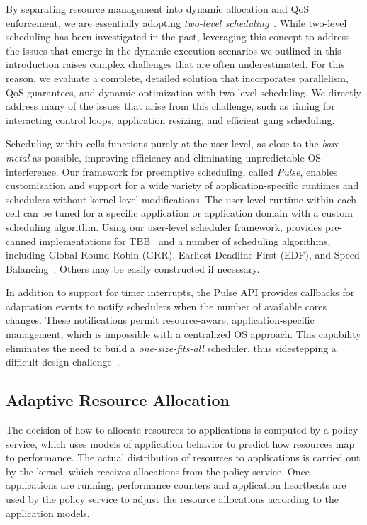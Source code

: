 By separating resource management into dynamic allocation and QoS
enforcement, we are essentially adopting \emph{two-level
scheduling}~\cite{leiner07,ober08,tess_resource}.
While two-level scheduling has been investigated in the past,
leveraging this concept to address the issues that emerge in the dynamic
execution scenarios we outlined in this introduction raises complex challenges
that are often underestimated.  For this
reason, we evaluate a complete, detailed solution that incorporates
parallelism, QoS guarantees, and dynamic optimization with two-level
scheduling.  We directly address many of the issues that arise from this
challenge, such as timing for interacting control loops, application
resizing, and efficient gang scheduling.

Scheduling within cells functions purely at the user-level, as
close to the \emph{bare metal} as possible, improving efficiency and
eliminating unpredictable OS interference.  Our framework for preemptive
scheduling, called \emph{Pulse}, enables customization and support for a wide
variety of application-specific runtimes and schedulers without
kernel-level modifications. 
The user-level runtime within each cell can be tuned for a specific
application or application domain with a custom scheduling algorithm.
Using our user-level scheduler framework, \tess provides pre-canned
implementations for TBB~\cite{tbb07} and a number of scheduling algorithms,
including Global Round Robin (GRR), Earliest Deadline First
(EDF), and Speed Balancing~\cite{juggle2013}.  Others may be easily
constructed if necessary.  

 
In addition to support for timer interrupts, the Pulse API provides callbacks
for adaptation events to notify schedulers when the number of available cores
changes.  
These notifications permit resource-aware, application-specific management,
which is impossible with a centralized OS approach.
This capability eliminates the need
to build a \emph{one-size-fits-all} scheduler, thus sidestepping a difficult
design challenge~\cite{cfs-vs-bfs}.



\subsection{Adaptive Resource Allocation} \label{sec:rsc-alloc}

The decision of how to allocate
resources to applications is computed by a policy service, which uses models of
application behavior to predict how resources map to performance. The actual
distribution of resources to applications is carried out by the kernel, which
receives allocations from the policy service. Once applications are running,
performance counters and application heartbeats are used by the policy service
to adjust the resource allocations according to the application models.

